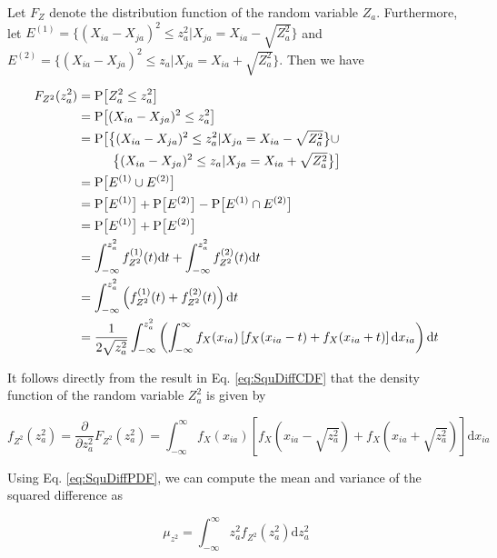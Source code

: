 \documentclass[10pt,letterpaper]{article}\usepackage[]{graphicx}\usepackage[]{color}
\begin{document}
Let $F_Z$ denote the distribution function of the random variable $Z_a$. Furthermore, let $E^{(1)}=\bigl\{(X_{ia}-X_{ja})^2 \leq z^2_a | X_{ja}=X_{ia}-\sqrt{Z^2_a}\bigr\}$ and $E^{(2)}=\bigl\{(X_{ia} - X_{ja})^2 \leq z_a | X_{ja}=X_{ia} + \sqrt{Z^2_a}\bigr\}$. Then we have

\begin{equation}\label{eq:SquDiffCDF}
\begin{aligned}
F_{Z^2}(z^2_a) &= \text{P}\bigl[Z^2_a \leq z^2_a\bigr] \\
&= \text{P}\bigl[(X_{ia} - X_{ja})^2 \leq z^2_a\bigr] \\
&= \text{P}\bigl[\bigl\{(X_{ia}-X_{ja})^2 \leq z^2_a | X_{ja}=X_{ia}-\sqrt{Z^2_a}\bigr\} \cup \\
&\hphantom{=} \quad \quad \bigl\{(X_{ia} - X_{ja})^2 \leq z_a | X_{ja}=X_{ia} + \sqrt{Z^2_a}\bigr\}\bigr] \\
&= \text{P}\bigl[E^{(1)} \cup E^{(2)}\bigr] \\
&= \text{P}\bigl[E^{(1)}\bigr] + \text{P}\bigl[E^{(2)}\bigr] - \text{P}\bigl[E^{(1)} \cap E^{(2)}\bigr] \\
&= \text{P}\bigl[E^{(1)}\bigr] + \text{P}\bigl[E^{(2)}\bigr] \\
&= \int_{-\infty}^{z^2_a} f^{(1)}_{Z^2}(t) \text{d}t + \int_{-\infty}^{z^2_a} f^{(2)}_{Z^2}(t) \text{d}t \\
&= \int_{-\infty}^{z^2_a} \left(f^{(1)}_{Z^2}(t) + f^{(2)}_{Z^2}(t)\right) \text{d}t \\
&= \frac{1}{2\sqrt{z^2_a}}\int_{-\infty}^{z^2_a} \left(\int_{-\infty}^{\infty}f_X(x_{ia})\left[f_X(x_{ia} - t) + f_X(x_{ia} + t)\right] \text{d}x_{ia}\right)\text{d}t
\end{aligned}
\end{equation}

It follows directly from the result in Eq. \ref{eq:SquDiffCDF} that the density function of the random variable $Z^2_a$ is given by

\begin{equation}\label{eq:SquDiffPDF}
f_{Z^2}(z^2_a) = \frac{\partial}{\partial z^2_a} F_{Z^2}(z^2_a) = \int_{-\infty}^{\infty} f_X(x_{ia}) \left[f_X(x_{ia} - \sqrt{z^2_a}) + f_X(x_{ia} + \sqrt{z^2_a})\right] \text{d}x_{ia}
\end{equation}

Using Eq. \ref{eq:SquDiffPDF}, we can compute the mean and variance of the squared difference as

\begin{equation}\label{eq:1DSquDiffMean}
\mu_{z^2} = \int_{-\infty}^{\infty} z^2_a f_{Z^2}(z^2_a) \text{d}z^2_a
\end{equation}
\end{document}
